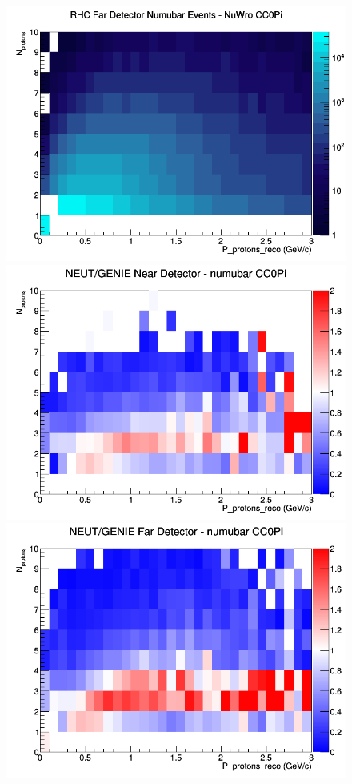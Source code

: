 \documentclass[12pt]{article}
\begin{document}
\begin{figure}[h]
\endminipage
{}
\includegraphics[width=\linewidth]{eff_N_P/FGT/protons/CC0Pi_RHC_FD_numubar_N_P_NuWro.png}
\endminipage
\newline
{}
\includegraphics[width=\linewidth]{eff_N_P/FGT/protons/ratios/CC0Pi_NEUT_GENIE_numubar_near_N_P.png}
\endminipage
{}
\includegraphics[width=\linewidth]{eff_N_P/FGT/protons/ratios/CC0Pi_NEUT_GENIE_numubar_far_N_P.png}

\end{figure}
\end{document}
